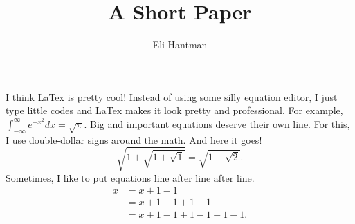\documentclass[11pt]{amsart}
\title{A Short Paper}
\author{Eli Hantman}
\date{}                                           %
\theoremstyle{remark}
\theoremstyle{definition}
\begin{document}
\maketitle

I think LaTex is                  pretty cool!  
Instead of using some silly equation editor, I just type little codes and LaTex makes it look pretty and professional.  For example, $\int_{-\infty}^\infty e^{-x^2} dx = \sqrt{\pi}$.
Big and important equations deserve their own line.  For this, I use double-dollar signs around the math.  And here it goes!
$$\sqrt{1 + \sqrt{1 + \sqrt{1}}} = \sqrt{1 + \sqrt{2}}.
$$
Sometimes, I like to put equations line after line after line.  
\begin{align*}
    x &= x + 1 - 1 \\
      &= x + 1 - 1 + 1 - 1 \\
      &= x + 1 - 1 + 1 - 1 + 1 - 1.
\end{align*}
\end{document}
